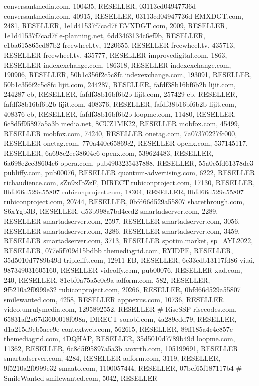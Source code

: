 conversantmedia.com, 100435, RESELLER, 03113cd04947736d
conversantmedia.com, 40915, RESELLER, 03113cd04947736d
EMXDGT.com, 2481, RESELLER, 1e1d41537f7cad7f
EMXDGT.com, 2009, RESELLER, 1e1d41537f7cad7f
e-planning.net, 6dd3463134c6ef9b, RESELLER, c1ba615865ed87b2
freewheel.tv, 1220655, RESELLER
freewheel.tv, 435713, RESELLER
freewheel.tv, 435777, RESELLER
improvedigital.com, 1863, RESELLER
indexexchange.com, 186318, RESELLER
indexexchange.com, 190906, RESELLER, 50b1c356f2c5c8fc
indexexchange.com, 193091, RESELLER, 50b1c356f2c5c8fc
lijit.com, 244287, RESELLER, fafdf38b16bf6b2b
lijit.com, 244287-eb, RESELLER, fafdf38b16bf6b2b
lijit.com, 257429-eb, RESELLER, fafdf38b16bf6b2b
lijit.com, 408376, RESELLER, fafdf38b16bf6b2b
lijit.com, 408376-eb, RESELLER, fafdf38b16bf6b2b
loopme.com, 11480, RESELLER, 6c8d5f95897a5a3b
media.net, 8CUZ1MK22, RESELLER
mobfox.com, 45499, RESELLER
mobfox.com, 74240, RESELLER
onetag.com, 7a07370227fc000, RESELLER
onetag.com, 770a440e65869c2, RESELLER
openx.com, 537145117, RESELLER, 6a698e2ec38604c6
openx.com, 539624483, RESELLER, 6a698e2ec38604c6
opera.com, pub4903235437888, RESELLER, 55a0c5fd61378de3
publiffy.com, pub00076, RESELLER
quantum-advertising.com, 6222, RESELLER
richaudience.com, sZn9xIbZzF, DIRECT
rubiconproject.com, 17130, RESELLER, 0bfd66d529a55807
rubiconproject.com, 18304, RESELLER, 0bfd66d529a55807
rubiconproject.com, 20744, RESELLER, 0bfd66d529a55807
sharethrough.com, S6xYgb3B, RESELLER, d53b998a7bd4ecd2
smartadserver.com, 2289, RESELLER
smartadserver.com, 2597, RESELLER
smartadserver.com, 3056, RESELLER
smartadserver.com, 3286, RESELLER
smartadserver.com, 3459, RESELLER
smartadserver.com, 3713, RESELLER
spotim.market, sp_AYL2022, RESELLER, 077e5f709d15bdbb
themediagrid.com, RYIDPE, RESELLER, 35d5010d7789b49d
triplelift.com, 12911-EB, RESELLER, 6c33edb13117fd86
vi.ai, 987349031605160, RESELLER
videoffy.com, pub00076, RESELLER
xad.com, 240, RESELLER, 81cbf0a75a5e0e9a
adform.com, 582, RESELLER, 9f5210a2f0999e32
rubiconproject.com, 20266, RESELLER, 0bfd66d529a55807
smilewanted.com, 4258, RESELLER
appnexus.com, 10736, RESELLER
video.unrulymedia.com, 1295892552, RESELLER
# RiseSSP
risecodes.com, 65831af2a67d3600018f098a, DIRECT
sonobi.com, 4a289cdd79, RESELLER, d1a215d9eb5aee9e
contextweb.com, 562615, RESELLER, 89ff185a4c4e857c
themediagrid.com, 4DQHAP, RESELLER, 35d5010d7789b49d
loopme.com, 11362, RESELLER, 6c8d5f95897a5a3b
amxrtb.com, 105199691, RESELLER
smartadserver.com, 4284, RESELLER
adform.com, 3119, RESELLER, 9f5210a2f0999e32
smaato.com, 1100057444, RESELLER, 07bcf65f187117b4
# SmileWanted
smilewanted.com, 5042, RESELLER
